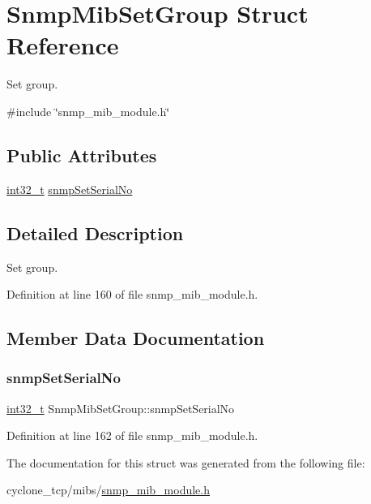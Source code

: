 \hypertarget{structSnmpMibSetGroup}{}\section{Snmp\+Mib\+Set\+Group Struct Reference}
\label{structSnmpMibSetGroup}


Set group.  




{\ttfamily \#include \char`\"{}snmp\+\_\+mib\+\_\+module.\+h\char`\"{}}

\subsection*{Public Attributes}
\begin{DoxyCompactItemize}
\item 
\hyperlink{stdint_8h_ab1967d8591af1a4e48c37fd2b0f184d0}{int32\+\_\+t} \hyperlink{structSnmpMibSetGroup_a7b3ff9e4961b996f3867591a54fc026d}{snmp\+Set\+Serial\+No}
\end{DoxyCompactItemize}


\subsection{Detailed Description}
Set group. 

Definition at line 160 of file snmp\+\_\+mib\+\_\+module.\+h.



\subsection{Member Data Documentation}
\mbox{\label{structSnmpMibSetGroup_a7b3ff9e4961b996f3867591a54fc026d}} 
\subsubsection{\texorpdfstring{snmp\+Set\+Serial\+No}{snmpSetSerialNo}}
{\footnotesize\ttfamily \hyperlink{stdint_8h_ab1967d8591af1a4e48c37fd2b0f184d0}{int32\+\_\+t} Snmp\+Mib\+Set\+Group\+::snmp\+Set\+Serial\+No}



Definition at line 162 of file snmp\+\_\+mib\+\_\+module.\+h.



The documentation for this struct was generated from the following file\+:\begin{DoxyCompactItemize}
\item 
cyclone\+\_\+tcp/mibs/\hyperlink{snmp__mib__module_8h}{snmp\+\_\+mib\+\_\+module.\+h}\end{DoxyCompactItemize}
